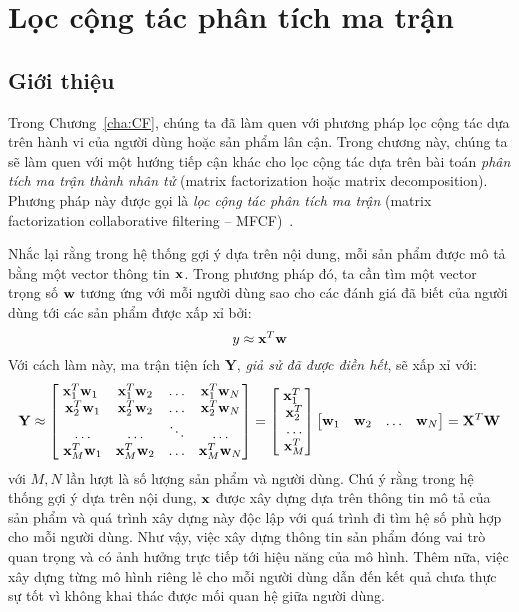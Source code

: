 \chapter{Lọc cộng tác phân tích ma trận}
\label{cha:matrix_factorization}
\section{Giới thiệu }
Trong Chương~\ref{cha:CF}, chúng ta đã làm quen với phương pháp
lọc cộng tác dựa trên hành vi của người dùng hoặc sản phẩm lân cận. Trong chương này, chúng ta sẽ làm quen với một hướng
tiếp cận khác cho lọc cộng tác dựa trên bài toán
\textit{phân tích ma trận thành nhân tử} ({matrix factorization} hoặc
{matrix decomposition}). Phương pháp này được gọi
là \textit{lọc cộng tác phân tích ma trận} ({matrix factorization collaborative filtering} -- MFCF)~\cite{koren2009matrix}.

Nhắc lại rằng trong hệ thống gợi ý dựa trên nội dung, mỗi sản phẩm được
mô tả bằng một vector thông tin $\mathbf{x}$. Trong phương pháp
đó, ta cần tìm một vector trọng số $\mathbf{w}$ tương ứng với mỗi người dùng sao cho các đánh giá đã biết của người dùng tới các sản phẩm được xấp xỉ bởi:
\begin{equation}
y \approx \mathbf{x}^T\mathbf{w}
\end{equation}
Với cách làm này, ma trận tiện ích $\mathbf{Y}$, \textit{giả sử đã được điền
hết}, sẽ xấp xỉ với:
\begin{equation}
\mathbf{Y} \approx \left[ \begin{matrix} \bx^T_1\bw_1 &
\bx^T_1\bw_2 & \dots & \bx^T_1 \bw_N\\\
\bx^T_2\bw_1 & \bx^T_2\bw_2 & \dots &
\bx^T_2 \bw_N\\\ \dots & \dots & \ddots & \dots \\\
\bx^T_M\bw_1 & \bx^T_M\bw_2 & \dots & \bx^T_M \bw_N \end{matrix} \right] = \left[ \begin{matrix} \bx^T_1 \\\ \bx^T_2 \\\ \dots \\\ \bx^T_M  \end{matrix} \right]
\left[ \begin{matrix} \bw_1 & \bw_2 & \dots & \bw_N \end{matrix} \right] = \bX^T\bW
\end{equation}
với $M, N$ lần lượt là số lượng sản phẩm và người dùng. Chú ý rằng trong
hệ thống gợi ý dựa trên nội dung, $\mathbf{x}$ được xây dựng dựa trên thông
tin mô tả của sản phẩm và quá trình xây dựng này độc lập với quá trình đi
tìm hệ số phù hợp cho mỗi người dùng. Như vậy, việc xây dựng thông tin sản phẩm đóng vai trò quan trọng và có ảnh hưởng trực tiếp tới hiệu năng của
mô hình. Thêm nữa, việc xây dựng từng mô hình riêng lẻ cho mỗi người dùng dẫn
đến kết quả chưa thực sự tốt vì không khai thác được mối quan hệ giữa
người dùng.

